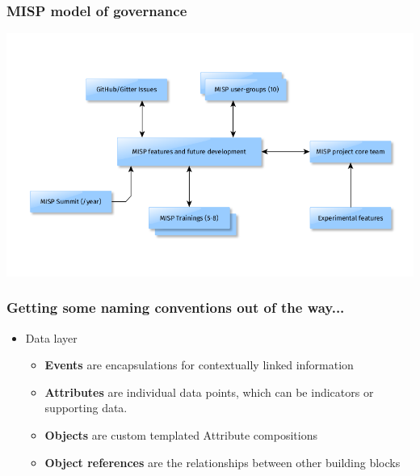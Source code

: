 \begin{frame}
    \frametitle{MISP model of governance}
    \includegraphics[scale=0.4]{governance.png}
\end{frame}

\begin{frame}
    \frametitle{Getting some naming conventions out of the way...}
     \begin{itemize}
            \item Data layer
            \begin{itemize}
                \item {\bf Events} are encapsulations for contextually linked information
                \item {\bf Attributes} are individual data points, which can be indicators or supporting data.
                \item {\bf Objects} are custom templated Attribute compositions
                \item {\bf Object references} are the relationships between other building blocks
            \end{itemize}
    \end{itemize}
\end{frame}

